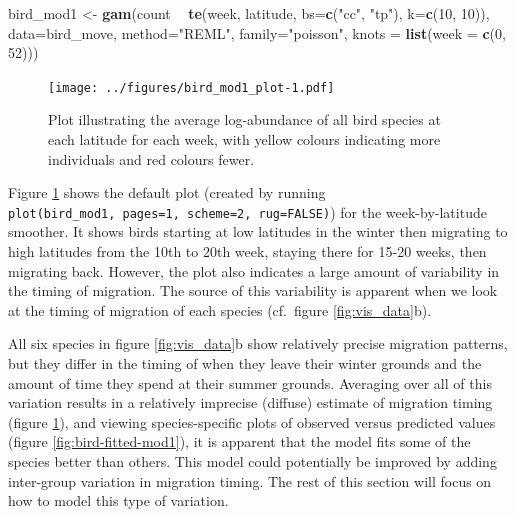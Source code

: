 \documentclass[12pt]{article}
\newenvironment{Shaded}{\begin{snugshade}}{\end{snugshade}}
\newcommand{\KeywordTok}[1]{\textcolor[rgb]{0.13,0.29,0.53}{\textbf{#1}}}
\newcommand{\DataTypeTok}[1]{\textcolor[rgb]{0.13,0.29,0.53}{#1}}
\newcommand{\DecValTok}[1]{\textcolor[rgb]{0.00,0.00,0.81}{#1}}
\newcommand{\StringTok}[1]{\textcolor[rgb]{0.31,0.60,0.02}{#1}}
\newcommand{\OperatorTok}[1]{\textcolor[rgb]{0.81,0.36,0.00}{\textbf{#1}}}
\newcommand{\NormalTok}[1]{#1}
\begin{document}
\begin{Shaded}
\begin{Highlighting}[]
\NormalTok{bird_mod1 <-}\StringTok{ }\KeywordTok{gam}\NormalTok{(count }\OperatorTok{~}\StringTok{ }\KeywordTok{te}\NormalTok{(week, latitude, }\DataTypeTok{bs=}\KeywordTok{c}\NormalTok{(}\StringTok{"cc"}\NormalTok{, }\StringTok{"tp"}\NormalTok{), }\DataTypeTok{k=}\KeywordTok{c}\NormalTok{(}\DecValTok{10}\NormalTok{, }\DecValTok{10}\NormalTok{)),}
                 \DataTypeTok{data=}\NormalTok{bird_move, }\DataTypeTok{method=}\StringTok{"REML"}\NormalTok{, }\DataTypeTok{family=}\StringTok{"poisson"}\NormalTok{,}
                 \DataTypeTok{knots =} \KeywordTok{list}\NormalTok{(}\DataTypeTok{week =} \KeywordTok{c}\NormalTok{(}\DecValTok{0}\NormalTok{, }\DecValTok{52}\NormalTok{)))}
\end{Highlighting}
\end{Shaded}

\begin{figure}
\centering
\texttt{[image: ../figures/bird\_mod1\_plot-1.pdf]}
\caption{\label{fig:bird_mod1} Plot illustrating the average
log-abundance of all bird species at each latitude for each week, with
yellow colours indicating more individuals and red colours fewer.}
\end{figure}

Figure \ref{fig:bird_mod1} shows the default plot (created by running
\texttt{plot(bird\_mod1,\ pages=1,\ scheme=2,\ rug=FALSE)}) for the
week-by-latitude smoother. It shows birds starting at low latitudes in
the winter then migrating to high latitudes from the 10th to 20th week,
staying there for 15-20 weeks, then migrating back. However, the plot
also indicates a large amount of variability in the timing of migration.
The source of this variability is apparent when we look at the timing of
migration of each species (cf.~figure \ref{fig:vis_data}b).

All six species in figure \ref{fig:vis_data}b show relatively precise
migration patterns, but they differ in the timing of when they leave
their winter grounds and the amount of time they spend at their summer
grounds. Averaging over all of this variation results in a relatively
imprecise (diffuse) estimate of migration timing (figure
\ref{fig:bird_mod1}), and viewing species-specific plots of observed
versus predicted values (figure \ref{fig:bird-fitted-mod1}), it is
apparent that the model fits some of the species better than others.
This model could potentially be improved by adding inter-group variation
in migration timing. The rest of this section will focus on how to model
this type of variation.
\end{document}
